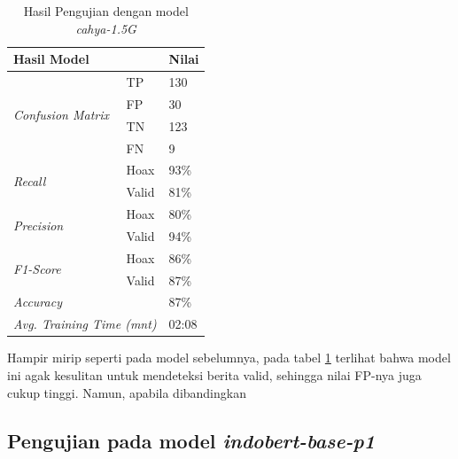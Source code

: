 \begin{table}[h]
    \caption{Hasil Pengujian dengan model \textit{cahya-1.5G}}
    \label{tab: loss_cahya1.5}
    \centering
    \begin{tabular}{|l|l|l|}
        \hline
        \multicolumn{2}{|l|}{\textbf{Hasil Model}}              & \textbf{Nilai}        \\ \hline
        \multirow{4}{*}{\textit{Confusion Matrix}}              & TP             & 130  \\ \cline{2-3}
                                                                & FP             & 30   \\ \cline{2-3}
                                                                & TN             & 123  \\ \cline{2-3}
                                                                & FN             & 9    \\ \hline
        \multirow{2}{*}{\textit{Recall}}                        & Hoax           & 93\% \\ \cline{2-3}
                                                                & Valid          & 81\% \\ \hline
        \multirow{2}{*}{\textit{Precision}}                     & Hoax           & 80\% \\ \cline{2-3}
                                                                & Valid          & 94\% \\ \hline
        \multirow{2}{*}{\textit{F1-Score}}                      & Hoax           & 86\% \\ \cline{2-3}
                                                                & Valid          & 87\% \\ \hline
        \multicolumn{2}{|l|}{\textit{Accuracy}}                 & 87\%                  \\ \hline
        \multicolumn{2}{|l|}{\textit{Avg. Training Time (mnt)}} & 02:08                 \\ \hline
    \end{tabular}
\end{table}

Hampir mirip seperti pada model sebelumnya, pada tabel \ref{tab: loss_cahya1.5} terlihat bahwa model ini agak kesulitan untuk mendeteksi berita valid, sehingga nilai FP-nya juga cukup tinggi. Namun, apabila dibandingkan

\subsection{Pengujian pada model \textit{indobert-base-p1}}

